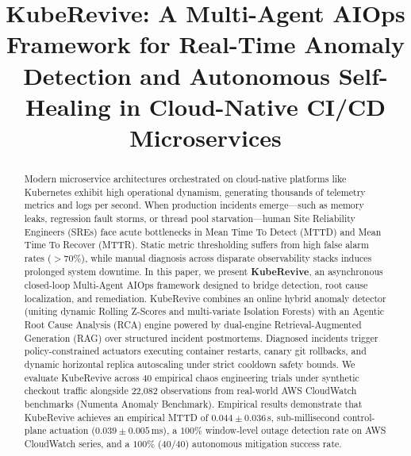 \documentclass[conference]{IEEEtran}
\begin{document}
\title{KubeRevive: A Multi-Agent AIOps Framework for Real-Time Anomaly Detection and Autonomous Self-Healing in Cloud-Native CI/CD Microservices}

\author{
}

\maketitle

\begin{abstract}
Modern microservice architectures orchestrated on cloud-native platforms like Kubernetes exhibit high operational dynamism, generating thousands of telemetry metrics and logs per second. When production incidents emerge---such as memory leaks, regression fault storms, or thread pool starvation---human Site Reliability Engineers (SREs) face acute bottlenecks in Mean Time To Detect (MTTD) and Mean Time To Recover (MTTR). Static metric thresholding suffers from high false alarm rates ($>70\%$), while manual diagnosis across disparate observability stacks induces prolonged system downtime. In this paper, we present \textbf{KubeRevive}, an asynchronous closed-loop Multi-Agent AIOps framework designed to bridge detection, root cause localization, and remediation. KubeRevive combines an online hybrid anomaly detector (uniting dynamic Rolling Z-Scores and multi-variate Isolation Forests) with an Agentic Root Cause Analysis (RCA) engine powered by dual-engine Retrieval-Augmented Generation (RAG) over structured incident postmortems. Diagnosed incidents trigger policy-constrained actuators executing container restarts, canary git rollbacks, and dynamic horizontal replica autoscaling under strict cooldown safety bounds. We evaluate KubeRevive across 40 empirical chaos engineering trials under synthetic checkout traffic alongside 22,082 observations from real-world AWS CloudWatch benchmarks (Numenta Anomaly Benchmark). Empirical results demonstrate that KubeRevive achieves an empirical MTTD of $0.044 \pm 0.036$\,s, sub-millisecond control-plane actuation ($0.039 \pm 0.005$\,ms), a $100\%$ window-level outage detection rate on AWS CloudWatch series, and a $100\%$ ($40/40$) autonomous mitigation success rate.
\end{abstract}
\end{document}
